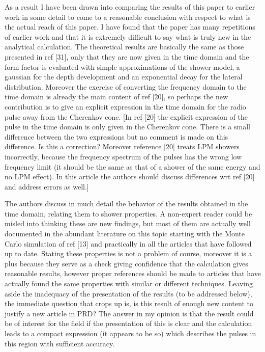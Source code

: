 \documentclass[12pt]{article}
\begin{document}
As a result I have been drawn into comparing the results of this paper to earlier work in some detail to come to a reasonable conclusion with respect to what is the actual reach of this paper. I have found that the paper has many repetitions of earlier work and that it is extremely difficult to say what is truly new in the analytical calculation. The theoretical results are basically the same as those presented in ref [31], only that they are now given in the time domain and the form factor is evaluated with simple approximations of the shower model, a gaussian for the depth development and an exponential decay for the lateral distribution. Moreover the exercise of converting the frequency domain to the time domain is already the main content of ref [20], so perhaps the new contribution is to give an explicit expression in the time domain for the radio pulse away from the Cherenkov cone. [In ref [20] the explicit expression of the pulse in the time domain is only given in the Cherenkov cone. There is a small difference between the two expressions but no comment is made on this difference.  Is this a correction? Moreover reference [20] treats LPM showers incorrectly, because the frequency spectrum of the pulses has the
wrong low frequency limit (it should be the same as that of a shower of the same energy and no LPM effect). In this article the authors should discuss differences wrt ref [20] and address errors as well.]

The authors discuss in much detail the behavior of the results obtained in the time domain, relating them to shower properties. A non-expert reader could be misled into thinking these are new findings, but most of them are actually well documented in the abundant literature on this topic starting with the Monte Carlo simulation of ref [13] and practically in all the articles that have followed up to date. Stating these properties is not a problem of course, moreover it is a plus because they serve as a check giving confidence that the calculation gives reasonable results, however proper references should be made to articles that have actually found the same properties with similar or different techniques. Leaving aside the inadequacy of the presentation of the results (to be addressed below), the immediate question that crops up is, is this result of enough new content to justify a new article in PRD? The
answer in my opinion is that the result could be of interest for the field if the presentation of this is clear and the calculation leads to a compact expression (it appears to be so) which describes the pulses in this region with sufficient accuracy.
\end{document}
